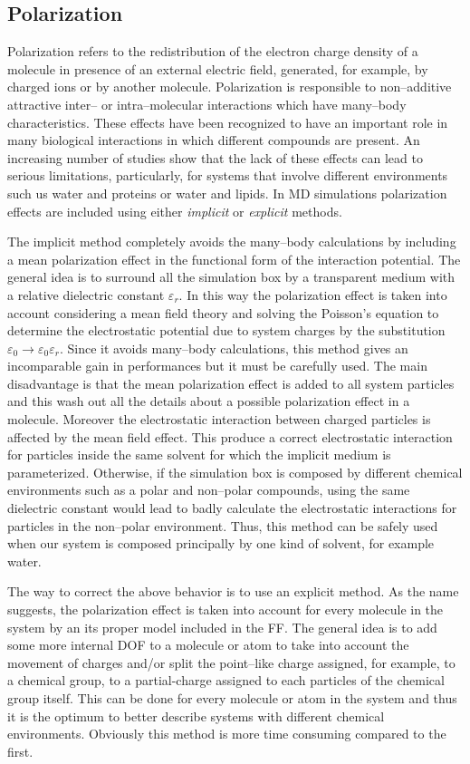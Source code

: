 \subsection{Polarization}
\label{sec:polarization}
Polarization refers to the redistribution of the electron charge density of a molecule in presence of an external 
electric field, generated, for example, by charged ions or by another molecule. Polarization is responsible to 
non--additive attractive inter-- or intra--molecular interactions which have many--body characteristics. These 
effects have been recognized to have an important role in many biological interactions in which different 
compounds are present. An increasing number of studies show that the lack of these effects can lead to serious 
limitations, particularly, for systems that involve different environments such us water and proteins or water 
and lipids. In \ac{MD} simulations polarization effects are included using either \textit{implicit} or 
\textit{explicit} methods.

The implicit method completely avoids the many--body calculations by including a mean polarization effect in the 
functional form of the interaction potential. The general idea is to surround all the simulation box by a 
transparent medium with a relative dielectric constant $\varepsilon_r$. In this way the polarization effect is 
taken into account considering a mean field theory and solving the Poisson's equation to determine the 
electrostatic potential due to system charges by the substitution 
$\varepsilon_0\rightarrow\varepsilon_0\varepsilon_r$. Since it avoids many--body calculations, this method gives 
an incomparable gain in performances but it must be carefully used. The main disadvantage is that the mean 
polarization effect is added to all system particles and this wash out all the details about a possible 
polarization effect in a molecule. Moreover the electrostatic interaction between charged particles is affected 
by the mean field effect. This produce a correct electrostatic interaction for particles inside the same solvent 
for which the implicit medium is parameterized. Otherwise, if the simulation box is composed by different 
chemical environments such as a polar and non--polar compounds, using the same dielectric constant would lead to 
badly calculate the electrostatic interactions for particles in the non--polar environment. Thus, this method can 
be safely used when our system is composed principally by one kind of solvent, for example water. 

The way to correct the above behavior is to use an explicit method. As the name suggests, the polarization effect 
is taken into account for every molecule in the system by an its proper model included in the \ac{FF}. The 
general idea is to add some more internal \ac{DOF} to a molecule or atom to take into account the movement of 
charges and/or split the point--like charge assigned, for example, to a chemical group, to a partial-charge 
assigned to each particles of the chemical group itself. This can be done for every molecule or atom in the 
system and thus it is the optimum to better describe systems with different chemical environments. Obviously this 
method is more time consuming compared to the first. 

